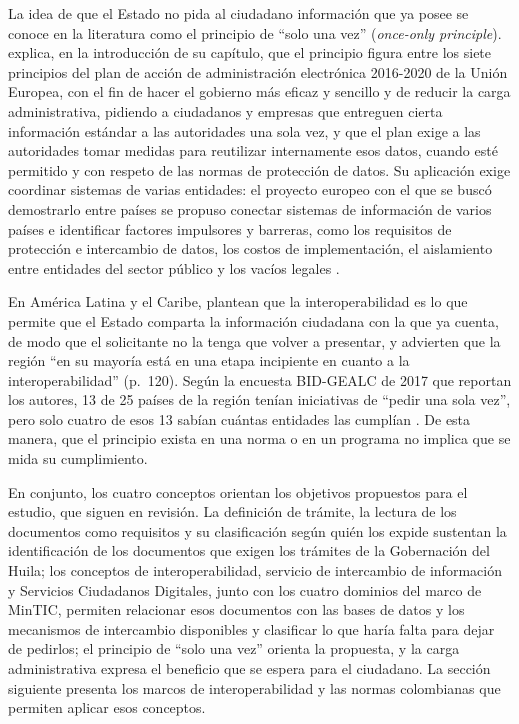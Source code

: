 La idea de que el Estado no pida al ciudadano información que ya posee se conoce en la literatura como el principio de \enquote{solo una vez} (\emph{once-only principle}). \textcite{wimmer2021once} explica, en la introducción de su capítulo, que el principio figura entre los siete principios del plan de acción de administración electrónica 2016-2020 de la Unión Europea, con el fin de hacer el gobierno más eficaz y sencillo y de reducir la carga administrativa, pidiendo a ciudadanos y empresas que entreguen cierta información estándar a las autoridades una sola vez, y que el plan exige a las autoridades tomar medidas para reutilizar internamente esos datos, cuando esté permitido y con respeto de las normas de protección de datos. Su aplicación exige coordinar sistemas de varias entidades: el proyecto europeo con el que se buscó demostrarlo entre países se propuso conectar sistemas de información de varios países e identificar factores impulsores y barreras, como los requisitos de protección e intercambio de datos, los costos de implementación, el aislamiento entre entidades del sector público y los vacíos legales \parencite{krimmer2017exploring} .

En América Latina y el Caribe, \textcite{roseth2018potencial} plantean que la interoperabilidad es lo que permite que el Estado comparta la información ciudadana con la que ya cuenta, de modo que el solicitante no la tenga que volver a presentar, y advierten que la región \enquote{en su mayoría está en una etapa incipiente en cuanto a la interoperabilidad} (p.~120). Según la encuesta BID-GEALC de 2017 que reportan los autores, 13 de 25 países de la región tenían iniciativas de \enquote{pedir una sola vez}, pero solo cuatro de esos 13 sabían cuántas entidades las cumplían \parencite[p.~147]{roseth2018potencial}. De esta manera, que el principio exista en una norma o en un programa no implica que se mida su cumplimiento.

En conjunto, los cuatro conceptos orientan los objetivos propuestos para el estudio, que siguen en revisión. La definición de trámite, la lectura de los documentos como requisitos y su clasificación según quién los expide sustentan la identificación de los documentos que exigen los trámites de la Gobernación del Huila; los conceptos de interoperabilidad, servicio de intercambio de información y Servicios Ciudadanos Digitales, junto con los cuatro dominios del marco de MinTIC, permiten relacionar esos documentos con las bases de datos y los mecanismos de intercambio disponibles y clasificar lo que haría falta para dejar de pedirlos; el principio de \enquote{solo una vez} orienta la propuesta, y la carga administrativa expresa el beneficio que se espera para el ciudadano. La sección siguiente presenta los marcos de interoperabilidad y las normas colombianas que permiten aplicar esos conceptos.

